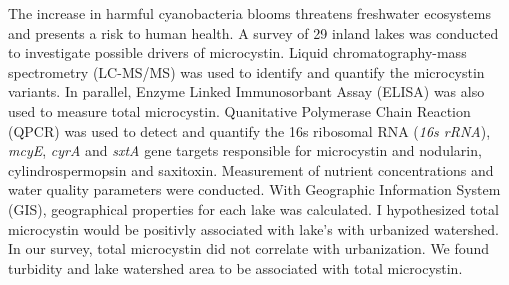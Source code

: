 The increase in harmful cyanobacteria blooms threatens freshwater ecosystems and presents a risk to human health.  A survey of 29 inland lakes was conducted to investigate possible drivers of microcystin. Liquid chromatography-mass spectrometry (LC-MS/MS) was used to identify and quantify the microcystin variants. In parallel, Enzyme Linked Immunosorbant Assay (ELISA) was also used to measure total microcystin. Quanitative Polymerase Chain Reaction (QPCR) was used to detect and quantify the 16s ribosomal RNA (\emph{16s rRNA}), \emph{mcyE}, \emph{cyrA} and \emph{sxtA} gene targets responsible for microcystin and nodularin, cylindrospermopsin and saxitoxin. Measurement of nutrient concentrations and water quality parameters were conducted. With Geographic Information System (GIS), geographical properties for each lake was calculated. I hypothesized total microcystin would be positivly associated with lake's with urbanized watershed. In our survey, total microcystin did not correlate with urbanization. We found turbidity and lake watershed area to be associated with total microcystin. 
